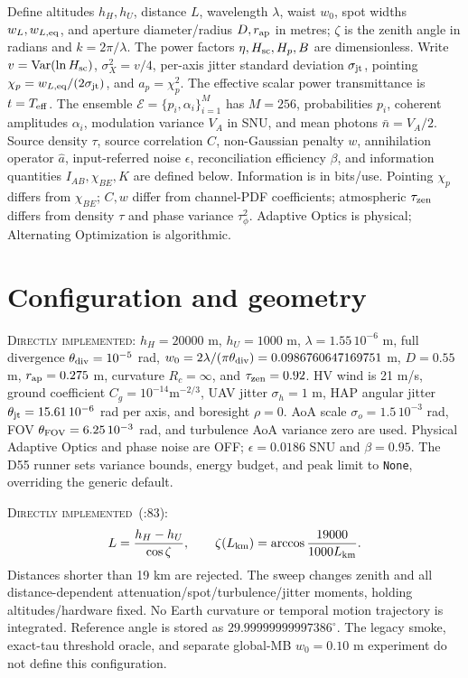 \documentclass[11pt]{article}
\newcommand{\src}[2]{\texttt{\detokenize{#1}}:#2}
\newcommand{\DI}{\textsc{Directly implemented}}
\begin{document}
Define altitudes $h_H,h_U$, distance $L$, wavelength $\lambda$, waist $w_0$,
spot widths $w_L,w_{L,\rm eq}$, and aperture diameter/radius $D,r_{\rm ap}$
in metres; $\zeta$ is the zenith angle in radians and $k=2\pi/\lambda$.
The power factors $\eta,H_{\rm sc},H_p,B$ are dimensionless.
Write $v=\operatorname{Var}(\ln H_{\rm sc})$, $\sigma_X^2=v/4$,
per-axis jitter standard deviation $\sigma_{\rm jt}$,
pointing $\chi_p=w_{L,\rm eq}/(2\sigma_{\rm jt})$, and $a_p=\chi_p^2$.
The effective scalar power transmittance is $t=T_{\rm eff}$.
The ensemble $\mathcal E=\{p_i,\alpha_i\}_{i=1}^{M}$ has $M=256$,
probabilities $p_i$, coherent amplitudes $\alpha_i$, modulation variance
$V_A$ in SNU, and mean photons $\bar n=V_A/2$.
Source density $\tau$, source correlation $C$, non-Gaussian penalty $w$,
annihilation operator $\hat a$, input-referred noise $\epsilon$,
reconciliation efficiency $\beta$, and information quantities $I_{AB},\chi_{BE},K$
are defined below. Information is in bits/use.
Pointing $\chi_p$ differs from $\chi_{BE}$; $C,w$ differ from channel-PDF
coefficients; atmospheric $\tau_{\rm zen}$ differs from density $\tau$ and
phase variance $\tau_\phi^2$. Adaptive Optics is physical; Alternating
Optimization is algorithmic.

\section{Configuration and geometry}
\DI: $h_H=20000$ m, $h_U=1000$ m, $\lambda=1.55\,10^{-6}$ m,
full divergence $\theta_{\rm div}=10^{-5}$ rad,
$w_0=2\lambda/(\pi\theta_{\rm div})=0.0986760647169751$ m,
$D=0.55$ m, $r_{\rm ap}=0.275$ m, curvature $R_c=\infty$,
and $\tau_{\rm zen}=0.92$.
HV wind is 21 m/s, ground coefficient $C_g=10^{-14}\mathrm{m}^{-2/3}$,
UAV jitter $\sigma_h=1$ m, HAP angular jitter
$\theta_{\rm jt}=15.61\,10^{-6}$ rad per axis, and boresight $\rho=0$.
AoA scale $\sigma_o=1.5\,10^{-3}$ rad, FOV $\theta_{\rm FOV}=6.25\,10^{-3}$
rad, and turbulence AoA variance zero are used.
Physical Adaptive Optics and phase noise are OFF;
$\epsilon=0.0186$ SNU and $\beta=0.95$.
The D55 runner sets variance bounds, energy budget, and peak limit to
\texttt{None}, overriding the generic default.

\DI\ (\src{scripts/run_uniform_beam_waist_diagnostic.py}{83}):
\begin{equation}
L=\frac{h_H-h_U}{\cos\zeta},\qquad
\zeta(L_{\rm km})=\arccos\frac{19000}{1000L_{\rm km}}.
\end{equation}
Distances shorter than 19 km are rejected. The sweep changes zenith and all
distance-dependent attenuation/spot/turbulence/jitter moments, holding
altitudes/hardware fixed. No Earth curvature or temporal motion trajectory is
integrated. Reference angle is stored as $29.99999999997386^\circ$.
The legacy smoke, exact-tau threshold oracle, and separate global-MB
$w_0=0.10$ m experiment do not define this configuration.
\end{document}
